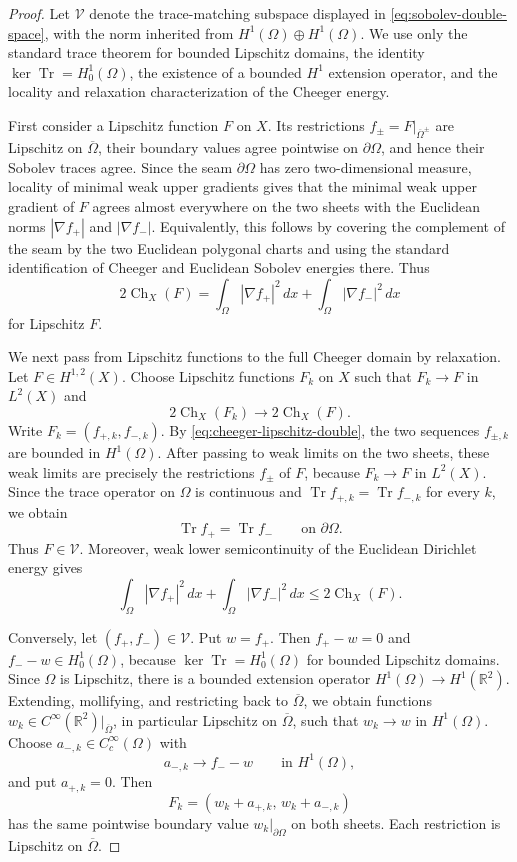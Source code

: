 \documentclass[11pt]{amsart}
\numberwithin{equation}{section}
\DeclareMathOperator{\Tr}{Tr}
\newcommand{\R}{\mathbb R}
\newcommand{\Om}{\Omega}
\begin{document}
\begin{proof}
Let $\mathcal V$ denote the trace-matching subspace displayed in
\eqref{eq:sobolev-double-space}, with the norm inherited from
$H^1(\Om)\oplus H^1(\Om)$.  We use only the standard trace theorem for bounded
Lipschitz domains, the identity $\ker\Tr=H_0^1(\Om)$, the existence of a
bounded $H^1$ extension operator, and the locality and relaxation
characterization of the Cheeger energy.

First consider a Lipschitz function $F$ on $X$.  Its restrictions
$f_\pm=F|_{\overline\Om^\pm}$ are Lipschitz on $\overline\Om$, their boundary
values agree pointwise on $\partial\Om$, and hence their Sobolev traces agree.
Since the seam $\partial\Om$ has zero two-dimensional measure, locality of
minimal weak upper gradients gives that the minimal weak upper gradient of $F$
agrees almost everywhere on the two sheets with the Euclidean norms
$|\nabla f_+|$ and $|\nabla f_-|$.  Equivalently, this follows by covering the
complement of the seam by the two Euclidean polygonal charts and using the
standard identification of Cheeger and Euclidean Sobolev energies there.  Thus
\begin{equation}\label{eq:cheeger-lipschitz-double}
2\operatorname{Ch}_X(F)=
\int_\Om |\nabla f_+|^2\,dx+
\int_\Om |\nabla f_-|^2\,dx
\end{equation}
for Lipschitz $F$.

We next pass from Lipschitz functions to the full Cheeger domain by relaxation.
Let $F\in H^{1,2}(X)$.  Choose Lipschitz functions $F_k$ on $X$ such that
$F_k\to F$ in $L^2(X)$ and
$$
2\operatorname{Ch}_X(F_k)\to 2\operatorname{Ch}_X(F).
$$
Write $F_k=(f_{+,k},f_{-,k})$.  By
\eqref{eq:cheeger-lipschitz-double}, the two sequences
$f_{\pm,k}$ are bounded in $H^1(\Om)$.  After passing to weak limits on the two
sheets, these weak limits are precisely the restrictions $f_\pm$ of $F$, because
$F_k\to F$ in $L^2(X)$.  Since the trace operator on $\Om$ is continuous and
$\Tr f_{+,k}=\Tr f_{-,k}$ for every $k$, we obtain
$$
\Tr f_+=\Tr f_-
\qquad\text{on }\partial\Om.
$$
Thus $F\in\mathcal V$.  Moreover, weak lower semicontinuity of the Euclidean
Dirichlet energy gives
\begin{equation}\label{eq:double-energy-lower-bound}
\int_\Om |\nabla f_+|^2\,dx+
\int_\Om |\nabla f_-|^2\,dx
\le
2\operatorname{Ch}_X(F).
\end{equation}

Conversely, let $(f_+,f_-)\in\mathcal V$.  Put $w=f_+$.  Then
$f_+-w=0$ and $f_--w\in H_0^1(\Om)$, because
$\ker\Tr=H_0^1(\Om)$ for bounded Lipschitz domains.  Since $\Om$ is Lipschitz,
there is a bounded extension operator $H^1(\Om)\to H^1(\R^2)$.  Extending,
mollifying, and restricting back to $\overline\Om$, we obtain functions
$w_k\in C^\infty(\R^2)|_{\overline\Om}$, in particular Lipschitz on
$\overline\Om$, such that $w_k\to w$ in $H^1(\Om)$.  Choose
$a_{-,k}\in C_c^\infty(\Om)$ with
$$
a_{-,k}\to f_--w
\qquad\text{in }H^1(\Om),
$$
and put $a_{+,k}=0$.  Then
$$
F_k=(w_k+a_{+,k},\,w_k+a_{-,k})
$$
has the same pointwise boundary value $w_k|_{\partial\Om}$ on both sheets.
Each restriction is Lipschitz on $\overline\Om$.


\end{proof}
\end{document}
